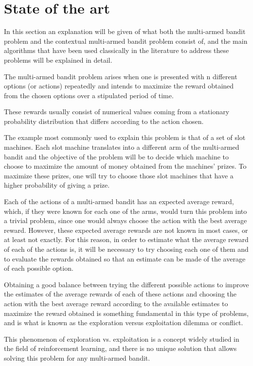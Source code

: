 \documentclass[../main.tex]{subfiles}
\begin{document}
\chapter{State of the art}\label{ch:stateofart}

In this section an explanation will be given of what both the multi-armed bandit
problem and the contextual multi-armed bandit problem consist of, and the main
algorithms that have been used classically in the literature to address these problems
will be explained in detail.  

The multi-armed bandit problem arises when one is presented with n different options
(or actions) repeatedly and intends to maximize the reward obtained from the chosen
options over a stipulated period of time.  

These rewards usually consist of numerical values coming from a stationary probability
distribution that differs according to the action chosen.  

The example most commonly used to explain this problem is that of a set of slot
machines. Each slot machine translates into a different arm of the multi-armed bandit
and the objective of the problem will be to decide which machine to choose to maximize
the amount of money obtained from the machines' prizes. To maximize these prizes, one
will try to choose those slot machines that have a higher probability of giving a
prize.  

Each of the actions of a multi-armed bandit has an expected average reward, which, if
they were known for each one of the arms, would turn this problem into a trivial
problem, since one would always choose the action with the best average reward.
However, these expected average rewards are not known in most cases, or at least not
exactly. For this reason, in order to estimate what the average reward of each of the
actions is, it will be necessary to try choosing each one of them and to evaluate the
rewards obtained so that an estimate can be made of the average of each possible
option.  

Obtaining a good balance between trying the different possible actions to improve the
estimates of the average rewards of each of these actions and choosing the action with
the best average reward according to the available estimates to maximize the reward
obtained is something fundamental in this type of problems, and is what is known as
the exploration versus exploitation dilemma or conflict.  

This phenomenon of exploration vs. exploitation is a concept widely studied in the
field of reinforcement learning, and there is no unique solution that allows solving
this problem for any multi-armed bandit.  
\end{document}
